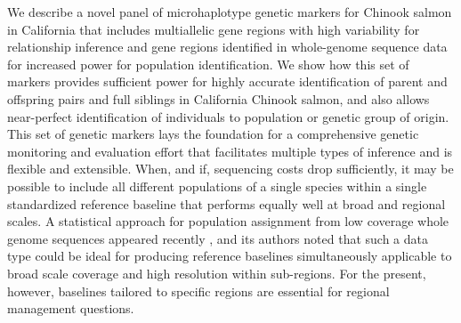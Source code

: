 We describe a novel panel of microhaplotype genetic markers for Chinook salmon
in California that includes multiallelic gene regions with high variability for
relationship inference and gene regions identified in whole-genome sequence data
for increased power for population identification. We show how this set of markers
provides sufficient power for highly accurate identification of parent and offspring
pairs and full siblings in California Chinook salmon, and also allows near-perfect
identification of individuals to population or genetic group of origin. This set of
genetic markers lays the foundation for a comprehensive genetic monitoring and evaluation effort
that facilitates multiple types of inference and is flexible and extensible.
When, and if, sequencing costs drop sufficiently, it may be possible to include
all different populations of a single species within a single standardized reference baseline
that performs equally well at broad and regional scales. A statistical approach for population
assignment from low coverage whole genome sequences appeared recently
\citep{desaixINPRESSpopulation}, and its authors noted that such a data type could
be ideal for producing reference baselines simultaneously applicable to broad scale
coverage and high resolution within sub-regions.   For the present, however,
baselines tailored to specific regions are essential for regional management questions.

